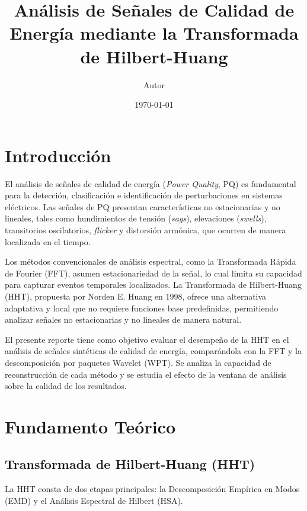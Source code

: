 \documentclass[12pt,a4paper]{article}
\title{\textbf{Análisis de Señales de Calidad de Energía mediante la Transformada de Hilbert-Huang}}
\author{Autor}
\date{\today}
\begin{document}
\maketitle
\tableofcontents
\newpage

\section{Introducción}


El análisis de señales de calidad de energía (\textit{Power Quality}, PQ) es fundamental para la detección, clasificación e identificación de perturbaciones en sistemas eléctricos. Las señales de PQ presentan características no estacionarias y no lineales, tales como hundimientos de tensión (\textit{sags}), elevaciones (\textit{swells}), transitorios oscilatorios, \textit{flicker} y distorsión armónica, que ocurren de manera localizada en el tiempo.

Los métodos convencionales de análisis espectral, como la Transformada Rápida de Fourier (FFT), asumen estacionariedad de la señal, lo cual limita su capacidad para capturar eventos temporales localizados. La Transformada de Hilbert-Huang (HHT), propuesta por Norden E. Huang en 1998, ofrece una alternativa adaptativa y local que no requiere funciones base predefinidas, permitiendo analizar señales no estacionarias y no lineales de manera natural.

El presente reporte tiene como objetivo evaluar el desempeño de la HHT en el análisis de señales sintéticas de calidad de energía, comparándola con la FFT y la descomposición por paquetes Wavelet (WPT). Se analiza la capacidad de reconstrucción de cada método y se estudia el efecto de la ventana de análisis sobre la calidad de los resultados.


\section{Fundamento Teórico}

\subsection{Transformada de Hilbert-Huang (HHT)}

La HHT consta de dos etapas principales: la Descomposición Empírica en Modos (EMD) y el Análisis Espectral de Hilbert (HSA).
\end{document}

